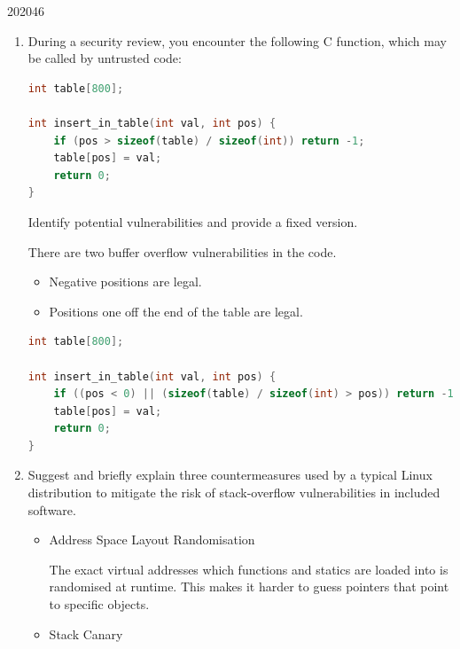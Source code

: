 \documentclass[10pt,\jkfside,a4paper]{article}
\begin{document}
\begin{examquestion}{2020}{4}{6}

\begin{enumerate}

\item During a security review, you encounter the following C function,
which may be called by untrusted code:

\begin{lstlisting}[language=C]
int table[800];

int insert_in_table(int val, int pos) {
    if (pos > sizeof(table) / sizeof(int)) return -1;
    table[pos] = val;
    return 0;
}
\end{lstlisting}

Identify potential vulnerabilities and provide a fixed version.

There are two buffer overflow vulnerabilities in the code.

\begin{itemize}

\item Negative positions are legal.

\item Positions one off the end of the table are legal.

\end{itemize}

\begin{lstlisting}[language=C]
int table[800];

int insert_in_table(int val, int pos) {
    if ((pos < 0) || (sizeof(table) / sizeof(int) > pos)) return -1;
    table[pos] = val;
    return 0;
}
\end{lstlisting}

\setcounter{enumi}{2}

\item Suggest and briefly explain three countermeasures used by a typical
Linux distribution to mitigate the risk of stack-overflow vulnerabilities
in included software.

\begin{itemize}

\item Address Space Layout Randomisation

The exact virtual addresses which functions and statics are loaded into is
randomised at runtime. This makes it harder to guess pointers that point
to specific objects.

\item Stack Canary


\end{itemize}
\end{enumerate}
\end{examquestion}
\end{document}
